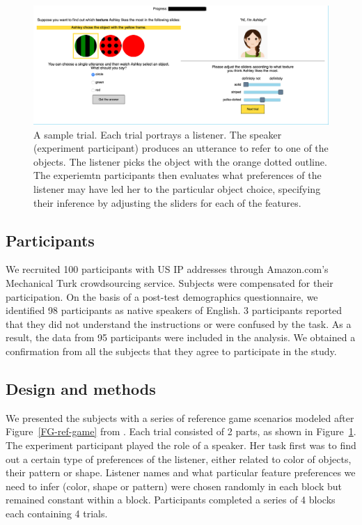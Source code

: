 \documentclass[10pt,a4paper]{article}
\begin{document}
\begin{figure}[ht!]
	\centering
	\includegraphics[width=5.5in]{images/utterance_choice_modification_4.png}
	\caption{ \small{A sample trial.  Each trial portrays a listener. The speaker (experiment participant) produces an utterance to refer to one of the objects. The listener picks the object with the orange dotted outline. The experiemtn participants then evaluates what preferences of the listener may have led her to the particular object choice, specifying their inference by adjusting the sliders for each of the features}.}
	\label{exp1-trial}
\end{figure}

\subsection{Participants}

We recruited 100 participants with US IP addresses through Amazon.com's Mechanical Turk crowdsourcing service. Subjects were compensated for their participation. On the basis of a post-test demographics questionnaire, we identified 98 participants as native speakers of English. 3 participants reported that they did not understand the instructions or were confused by the task. As a result, the data from 95 participants were included in the analysis. We obtained a confirmation from all the subjects that they agree to participate in the study.

\subsection{Design and methods}

We presented the subjects with a series of reference game scenarios modeled after Figure~\ref{FG-ref-game} from .
Each trial consisted of 2 parts, as shown in Figure~\ref{exp1-trial}. The experiment participant played the role of a speaker. Her task first was to find out a certain type of preferences of the listener, either related to color of objects, their pattern or shape. Listener names and what particular feature preferences we need to infer (color, shape or pattern) were chosen randomly in each block but remained constant within a block. Participants completed a series of 4 blocks each containing 4 trials. 
\end{document}
